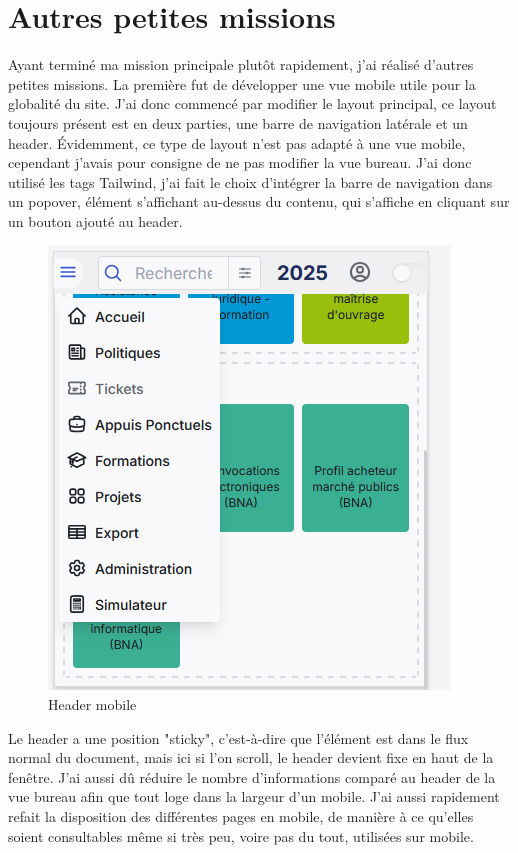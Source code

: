 \documentclass[a4paper,12pt]{report}
\begin{document}
\section{Autres petites missions}
Ayant terminé ma mission principale plutôt rapidement, j'ai réalisé d'autres petites missions. La première fut de développer une vue mobile utile pour la globalité du site. J'ai donc commencé par modifier le layout principal, ce layout toujours présent est en deux parties, une barre de navigation latérale et un header. Évidemment, ce type de layout n'est pas adapté à une vue mobile, cependant j'avais pour consigne de ne pas modifier la vue bureau. J'ai donc utilisé les tags Tailwind, j'ai fait le choix d'intégrer la barre de navigation dans un popover, élément s'affichant au-dessus du contenu, qui s'affiche en cliquant sur un bouton ajouté au header.

\begin{figure}[H]
    \centering
    \includegraphics[scale=0.6]{headerMob.png}
    \caption{Header mobile}
    \label{fig:header-mob}
\end{figure}

Le header a une position "sticky", c'est-à-dire que l'élément est dans le flux normal du document, mais ici si l'on scroll, le header devient fixe en haut de la fenêtre. J'ai aussi dû réduire le nombre d'informations comparé au header de la vue bureau afin que tout loge dans la largeur d'un mobile.
J'ai aussi rapidement refait la disposition des différentes pages en mobile, de manière à ce qu'elles soient consultables même si très peu, voire pas du tout, utilisées sur mobile.
\end{document}
